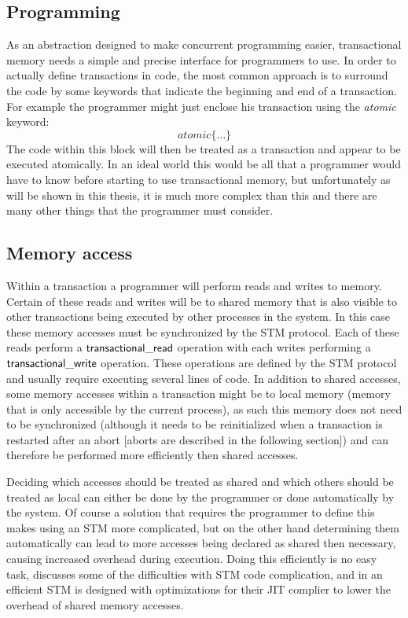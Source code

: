 \subsection{Programming}
As an abstraction designed to make concurrent programming easier, transactional memory needs a
simple and precise interface for programmers to use.
In order to actually define transactions in code, the most common
approach is to surround the code by some keywords that indicate the beginning and end of a transaction.
For example the programmer might just enclose his transaction using the \emph{atomic} keyword:
$$atomic\{\ldots\}$$
The code within this block will then be treated as a transaction and appear to be executed atomically.
In an ideal world this would be all that a programmer would have to know before starting to use
transactional memory, but unfortunately as will be shown in this thesis, it is much more complex than this
and there are many other things that the programmer must consider.


\subsection{Memory access}
Within a transaction a programmer will perform reads and writes to memory.
Certain of these reads and writes will be to shared memory that is also visible to other transactions
being executed by other processes in the system.
In this case these memory accesses must be synchronized by the STM protocol.
Each of these reads perform a $\lit{transactional\_read}$ operation with each writes performing a $\lit{transactional\_write}$ operation.
These operations are defined by the STM protocol and usually require executing several lines of code.
In addition to shared accesses, some memory accesses within a transaction might be to local memory
(memory that is only accessible by the current process),
as such this memory does not need to be synchronized (although it needs to be reinitialized when a transaction is
restarted after an abort [aborts are described in the following section]) and can therefore be performed more efficiently then shared accesses.

Deciding which accesses should be treated as shared and which others should be treated as local
can either be done by the programmer or done automatically by the system.
Of course a solution that requires the programmer to define this makes using an STM more complicated, but on
the other hand determining them automatically can lead to more accesses being declared as shared then necessary,
causing increased overhead during execution.
Doing this efficiently is no easy task, \cite{DFGG11} discusses some of the difficulties with STM code complication,
and in \cite{1133985} an efficient STM is designed with optimizations for their JIT complier to lower the overhead
of shared memory accesses.

